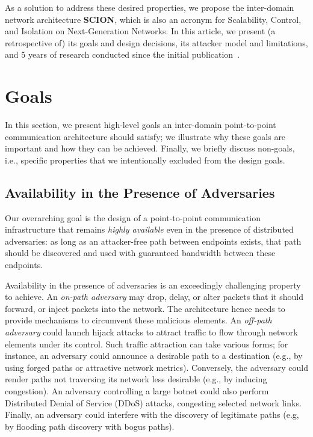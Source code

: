 \documentclass[a4paper]{llncs}
\newcommand\SCION{{\small\textsf{SCION}}\xspace}
\begin{document}
As a solution to address these desired properties, we propose the
inter-domain network architecture \textbf{\SCION}, which is also an
acronym for Scalability, Control, and Isolation on Next-Generation
Networks. In this article, we present (a retrospective
of) its goals and design decisions, its attacker model and
limitations, and 5 years of research conducted since the initial
publication~\cite{ZhHsHaChPeAn2011}.



 

\section{Goals}


In this section, we present high-level goals an inter-domain
point-to-point communication architecture should satisfy; we
illustrate why these goals are important and how they can be
achieved. Finally, we briefly discuss non-goals, i.e., specific
properties that we intentionally excluded from the design goals.







\subsection{Availability in the Presence of Adversaries}


Our overarching goal is the design of a point-to-point communication
infrastructure that remains \emph{highly available} even in the
presence of distributed adversaries: as long as an attacker-free path
between endpoints exists, that path should be discovered and used
with guaranteed bandwidth between these endpoints.

Availability in the presence of adversaries is an exceedingly challenging
property to achieve. An \emph{on-path adversary} may drop, delay, or alter
packets that it should forward, or inject packets into the network.  The
architecture hence needs to provide mechanisms to circumvent these malicious
elements. An \emph{off-path adversary} could launch hijack attacks to attract traffic to flow through
network elements under its control. Such traffic attraction can take various
forms; for instance, an adversary could announce a desirable path to a
destination (e.g., by using forged paths or attractive network metrics). Conversely, the
adversary
could render paths not traversing its network less desirable (e.g.,
by inducing congestion).  An adversary controlling a large botnet could also
perform Distributed Denial of Service (DDoS) attacks, congesting selected
network links.
Finally, an adversary could interfere with the discovery of legitimate paths (e.g,
by flooding path discovery with bogus paths).
\end{document}
